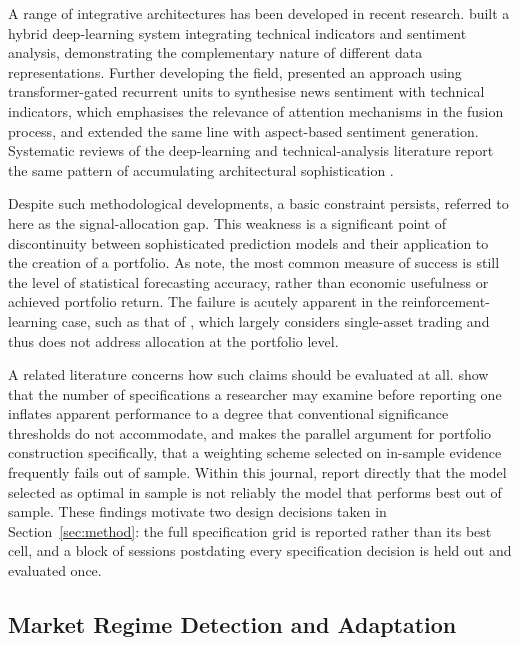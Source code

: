 A range of integrative architectures has been developed in recent research.
\citet{moodi24} built a hybrid deep-learning system integrating technical indicators and
sentiment analysis, demonstrating the complementary nature of different data
representations. Further developing the field, \citet{haryono23} presented an approach
using transformer-gated recurrent units to synthesise news sentiment with technical
indicators, which emphasises the relevance of attention mechanisms in the fusion process,
and \citet{haryono24} extended the same line with aspect-based sentiment generation.
Systematic reviews of the deep-learning and technical-analysis literature report the same
pattern of accumulating architectural sophistication \citep{li20,wang20}.

Despite such methodological developments, a basic constraint persists, referred to here
as the signal-allocation gap. This weakness is a significant point of discontinuity
between sophisticated prediction models and their application to the creation of a
portfolio. As \citet{zhang22} note, the most common measure of success is still the level
of statistical forecasting accuracy, rather than economic usefulness or achieved
portfolio return. The failure is acutely apparent in the reinforcement-learning case,
such as that of \citet{kabbani22}, which largely considers single-asset trading and thus
does not address allocation at the portfolio level.

A related literature concerns how such claims should be evaluated at all.
\citet{harvey15} show that the number of specifications a researcher may examine before
reporting one inflates apparent performance to a degree that conventional significance
thresholds do not accommodate, and \citet{prado16} makes the parallel argument for
portfolio construction specifically, that a weighting scheme selected on in-sample
evidence frequently fails out of sample. Within this journal, \citet{zhangz25} report
directly that the model selected as optimal in sample is not reliably the model that
performs best out of sample. These findings motivate two design decisions taken in
Section~\ref{sec:method}: the full specification grid is reported rather than its best
cell, and a block of sessions postdating every specification decision is held out and
evaluated once.

\subsection{Market Regime Detection and Adaptation}

